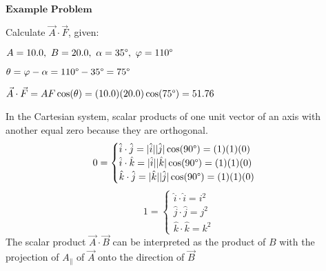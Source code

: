 \documentclass[a4paper]{article}
\let\phi\varphi
\let\bf\textbf
\begin{document}
    \begin{center}
        $\bf{Example Problem}$

        Calculate $\vec{A} \cdot \vec{F}$, given:

        $A = 10.0,\ B = 20.0,\ \alpha = 35\degree ,\ \phi = 110\degree$
        
        $\theta = \phi - \alpha = 110\degree - 35\degree = 75\degree$

        $\vec{A} \cdot \vec{F} = AF\cos(\theta) = (10.0)(20.0)\cos(75\degree) = 51.76$
    \end{center}
    In the Cartesian system, scalar products of one unit vector of an axis with another equal zero because they are orthogonal.
    \begin{equation}
        0 = 
        \begin{cases}
            \hat{i} \cdot \hat{j} = |\hat{i}||\hat{j}|\cos(90\degree) = (1)(1)(0) \\
            \hat{i} \cdot \hat{k} = |\hat{i}||\hat{k}|\cos(90\degree) = (1)(1)(0) \\
            \hat{k} \cdot \hat{j} = |\hat{k}||\hat{j}|\cos(90\degree) = (1)(1)(0)
        \end{cases}
    \end{equation}
    \begin{equation}
        1 = 
        \begin{cases}
            \hat{i} \cdot \hat{i} = i^2 \\
            \hat{j} \cdot \hat{j} = j^2 \\
            \hat{k} \cdot \hat{k} = k^2
        \end{cases}
    \end{equation}
    The scalar product $\vec{A} \cdot \vec{B}$ can be interpreted as the product of $B$ with the projection of $A_{\parallel}$ of $\vec{A}$ onto the direction of $\vec{B}$
    \begin{center}
    \end{center}
\end{document}
